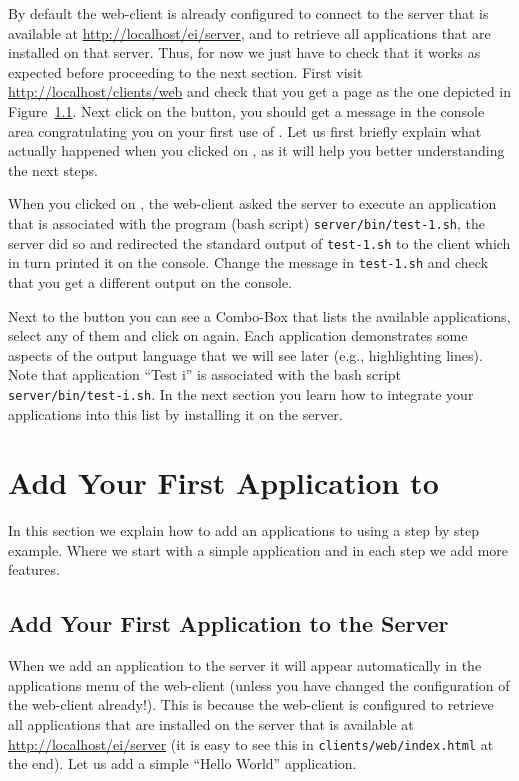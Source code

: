 By default the web-client is already configured to connect to the \ei
server that is available at \url{http://localhost/ei/server}, and to
retrieve all applications that are installed on that server. Thus, for
now we just have to check that it works as expected before proceeding
to the next section.
%
First visit \url{http://localhost/clients/web} and check that you get
a page as the one depicted in Figure~\ref{}.  Next click on the
\applybutton button, you should get a message in the console area
congratulating you on your first use of \ei. Let us first briefly
explain what actually happened when you clicked on \applybutton, as it
will help you better understanding the next steps.

When you clicked on \applybutton, the web-client asked the server to
execute an application that is associated with the program (bash
script) \texttt{server/bin/test-1.sh}, the server did so and
redirected the standard output of \texttt{test-1.sh} to the client
which in turn printed it on the console. Change the message in
\texttt{test-1.sh} and check that you get a different output on the
console.

Next to the \applybutton button you can see a Combo-Box that lists the
available applications, select any of them and click on \applybutton
again. Each application demonstrates some aspects of the output
language that we will see later (e.g., highlighting lines). Note that
application ``Test i'' is associated with the bash script
\texttt{server/bin/test-i.sh}. 
%
In the next section you learn how to integrate your applications into
this list by installing it on the \ei server.

\section{Add Your First Application to \ei}

In this section we explain how to add an applications to \ei using a
step by step example. Where we start with a simple application and in
each step we add more features.


\subsection{Add Your First Application to the \ei Server}

When we add an application to the \ei server it will appear
automatically in the applications menu of the web-client (unless you
have changed the configuration of the web-client already!).
%
This is because the web-client is configured to retrieve all
applications that are installed on the server that is available at
\url{http://localhost/ei/server} (it is easy to see this in
\texttt{clients/web/index.html} at the end). Let us add a simple
``Hello World'' application.


